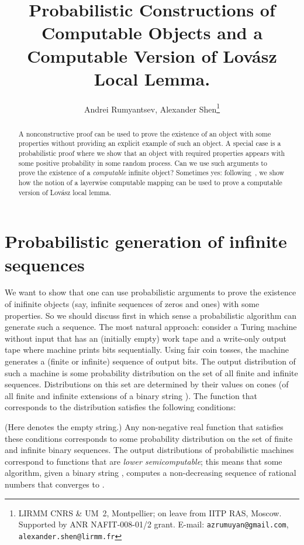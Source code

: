 \documentclass[12pt]{article}
\title{Probabilistic Constructions of Computable Objects and a Computable Version of Lov\'asz Local Lemma.}
\author{Andrei Rumyantsev, Alexander Shen\thanks{LIRMM CNRS \& UM~2, Montpellier; on leave from IITP RAS, Moscow. Supported by ANR NAFIT-008-01/2 grant. E-mail: \texttt{azrumuyan@gmail.com}, \texttt{alexander.shen@lirmm.fr}}}
\begin{document}
\maketitle

\begin{abstract}
A nonconstructive proof can be used to prove the existence of an object with some properties without providing an explicit example of such an object. A special case is a probabilistic proof  where we show that an object with required properties appears with some positive probability in some random process. Can we use such arguments to prove  the existence of a \emph{computable} infinite object? Sometimes yes: following~\cite{rumyantsev-positive}, we show how the notion of a layerwise computable mapping can be used to prove a computable version of Lov\'asz local lemma.
\end{abstract}

\section{Probabilistic generation of infinite sequences}

We want to show that one can use probabilistic arguments to prove the existence of inifinite objects (say, infinite sequences of zeros and ones) with some properties. So we should discuss first in which sense a probabilistic algorithm can generate such a sequence. The most natural approach: consider a Turing machine without input that has an (initially empty) work tape and a write-only output tape where machine prints bits sequentially. Using fair coin tosses, the machine generates a (finite or infinite) sequence of output bits. The output distribution of such a machine  is some probability distribution  on the set of all finite and infinite sequences. Distributions on this set are determined by their values on cones  (of all finite and infinite extensions of a binary string ). The function  that corresponds to the distribution  satisfies the following conditions:
    
(Here  denotes the empty string.) Any non-negative real function that satisfies these conditions corresponds to some probability distribution on the set of finite and infinite binary sequences. The output distributions of probabilistic machines correspond to functions  that are \emph{lower semicomputable}; this means that some algorithm, given a binary string , computes a non-decreasing sequence of rational numbers that converges to .
\end{document}

